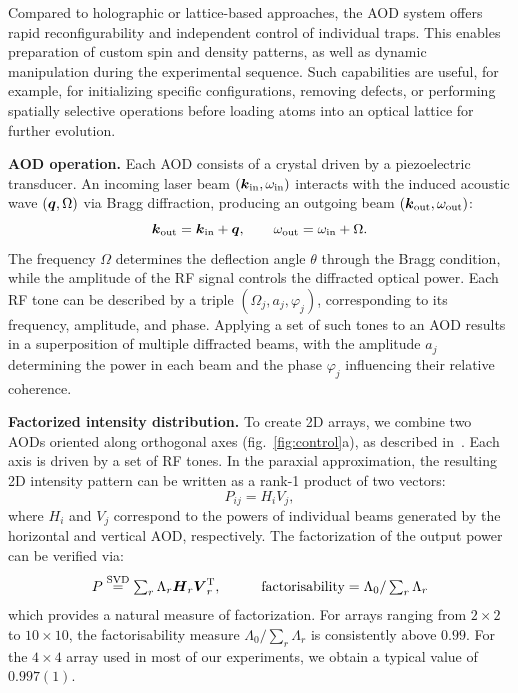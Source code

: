 Compared to holographic or lattice-based approaches, the AOD system offers rapid reconfigurability and independent control of individual traps. This enables preparation of custom spin and density patterns, as well as dynamic manipulation during the experimental sequence. Such capabilities are useful, for example, for initializing specific configurations, removing defects, or performing spatially selective operations before loading atoms into an optical lattice for further evolution.

\textbf{AOD operation.} Each AOD consists of a crystal driven by a piezoelectric transducer. An incoming laser beam $(\boldsymbol{k}_{\mathrm{in}}, \omega_{\mathrm{in}})$ interacts with the induced acoustic wave $(\boldsymbol{q}, \Omega)$ via Bragg diffraction, producing an outgoing beam $(\boldsymbol{k}_{\mathrm{out}}, \omega_{\mathrm{out}})$:
\begin{equation*}
    \boldsymbol{k}_{\mathrm{out}} = \boldsymbol{k}_{\mathrm{in}} + \boldsymbol{q}, \qquad \omega_{\mathrm{out}} = \omega_{\mathrm{in}} + \Omega.
\end{equation*}
The frequency $\Omega$ determines the deflection angle $\theta$ through the Bragg condition, while the amplitude of the RF signal controls the diffracted optical power. Each RF tone can be described by a triple $(\Omega_j, a_j, \varphi_j)$, corresponding to its frequency, amplitude, and phase. Applying a set of such tones to an AOD results in a superposition of multiple diffracted beams, with the amplitude $a_j$ determining the power in each beam and the phase $\varphi_j$ influencing their relative coherence.


\textbf{Factorized intensity distribution.} 
To create 2D arrays, we combine two AODs oriented along orthogonal axes (fig.~\ref{fig:control}a), as described in~\cite{culemann_construction_2024}.
Each axis is driven by a set of RF tones. In the paraxial approximation, the resulting 2D intensity pattern can be written as a rank-1 product of two vectors:
\begin{equation*}
    P_{ij} = H_i V_j,
\end{equation*}
where $H_i$ and $V_j$ correspond to the powers of individual beams generated by the horizontal and vertical AOD, respectively. The factorization of the output power can be verified via:
\begin{equation}
\label{eq:factorisability}
    P \overset{\mathrm{SVD}}{=} \textstyle \sum_r \Lambda_r \vc{H}_r \vc{V}_r\T,
    \hspace{10 mm} 
    \text{factorisability} = \Lambda_0 / \sum_r \Lambda_r 
\end{equation}
which provides a natural measure of factorization. For arrays ranging from $2\times2$ to $10\times10$, the factorisability measure $\Lambda_0 / \sum_r \Lambda_r$ is consistently above $0.99$. For the $4\times4$ array used in most of our experiments, we obtain a typical value of $0.997(1)$.

